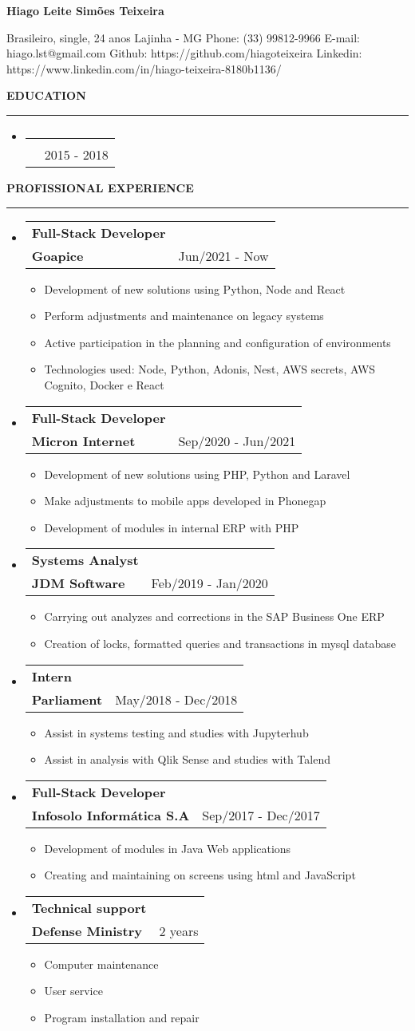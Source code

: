 \documentclass[a4paper,10pt]{article}
\makeatletter
\newcommand{\EducationItem}[3]{
    \item
    \begin{tabular*}{0.93\textwidth}[t]{l@{\extracolsep{\fill}}r}
        \normalfont{#1} & \\
        \small\normalfont{#2} & \scriptsize#3
    \end{tabular*}
}
\newcommand{\WorkExpItem}[3]{
    \item
        \begin{tabular*}{0.93\textwidth}[t]{l@{\extracolsep{\fill}}r}
            \textbf{#1} & \\
            \small\textbf{#2} & \scriptsize#3 \\
        \end{tabular*}
}
\newcommand{\WorkExpActivitiesBegin}[0]{
    \vspace{-5pt}\begin{itemize}
}
\newcommand{\WorkExpActivitiesItem}[1]{
    \vspace{-2pt}\item[]\small #1
}
\newcommand{\WorkExpActivitiesEnd}[0]{
    \end{itemize}\vspace{-7pt}
}
\newcommand{\SectionTitle}[1]{
    \begin{flushleft}
    \textbf{#1}
    \noindent\textcolor{gray}{\rule{18.5cm}{1px}}
    \end{flushleft}
}
\newcommand{\SectionBegin}[0]{
    \vspace{-16pt}\begin{flushleft}
    \begin{itemize}
}
\newcommand{\SectionEnd}[0]{
    \end{itemize}
    \end{flushleft}\vspace{-2pt}
}
\newcommand{\PersonInformation}[7]{
    \begin{flushleft}
        \begin{LARGE}
            \textbf{#1}
        \end{LARGE}
    \end{flushleft}

    \begin{flushleft}
        #2
        \newline
        #3
        \newline
        Phone: #4
        \newline
        E-mail: #5
        \newline
        Github: #6
        \newline
        Linkedin: #7
        \newline
    \end{flushleft}
}
\makeatother
\begin{document}

\PersonInformation
{Hiago Leite Simões Teixeira}
{Brasileiro, single, 24 anos}
{Lajinha - MG}
{(33) 99812-9966}
{hiago.lst@gmail.com}
{https://github.com/hiagoteixeira}
{https://www.linkedin.com/in/hiago-teixeira-8180b1136/}

\SectionTitle
{EDUCATION}
\SectionBegin
\EducationItem
{Bachelor on Computer science}
{Centro Universitário de Brasília - UniCEUB}
{2015 - 2018}
\SectionEnd

\SectionTitle
{PROFISSIONAL EXPERIENCE}
\SectionBegin
\WorkExpItem
{Full-Stack Developer}
{Goapice}
{Jun/2021 - Now}
\WorkExpActivitiesBegin
\WorkExpActivitiesItem{Development of new solutions using Python, Node and React}
\WorkExpActivitiesItem{Perform adjustments and maintenance on legacy systems}
\WorkExpActivitiesItem{Active participation in the planning and configuration of environments}
\WorkExpActivitiesItem{Technologies used: Node, Python, Adonis, Nest, AWS secrets, AWS Cognito, Docker e React}
\WorkExpActivitiesEnd

\WorkExpItem
{Full-Stack Developer}
{Micron Internet}
{Sep/2020 - Jun/2021}
\WorkExpActivitiesBegin
\WorkExpActivitiesItem{Development of new solutions using PHP, Python and Laravel}
\WorkExpActivitiesItem{Make adjustments to mobile apps developed in Phonegap}
\WorkExpActivitiesItem{Development of modules in internal ERP with PHP}
\WorkExpActivitiesEnd
\WorkExpItem
{Systems Analyst}
{JDM Software}
{Feb/2019 - Jan/2020}
\WorkExpActivitiesBegin
\WorkExpActivitiesItem{Carrying out analyzes and corrections in the SAP Business One ERP}
\WorkExpActivitiesItem{Creation of locks, formatted queries and transactions in mysql database}
\WorkExpActivitiesEnd
\WorkExpItem
{Intern}
{Parliament}
{May/2018 - Dec/2018}
\WorkExpActivitiesBegin
\WorkExpActivitiesItem{Assist in systems testing and studies with Jupyterhub}
\WorkExpActivitiesItem{Assist in analysis with Qlik Sense and studies with Talend}
\WorkExpActivitiesEnd
\WorkExpItem
{Full-Stack Developer}
{Infosolo Informática S.A}
{Sep/2017 - Dec/2017}
\WorkExpActivitiesBegin
\WorkExpActivitiesItem{Development of modules in Java Web applications}
\WorkExpActivitiesItem{Creating and maintaining on screens using html and JavaScript}
\WorkExpActivitiesEnd
\WorkExpItem
{Technical support}
{Defense Ministry}
{2 years}
\WorkExpActivitiesBegin
\WorkExpActivitiesItem{Computer maintenance}
\WorkExpActivitiesItem{User service}
\WorkExpActivitiesItem{Program installation and repair}
\WorkExpActivitiesEnd
\SectionEnd
\end{document}

